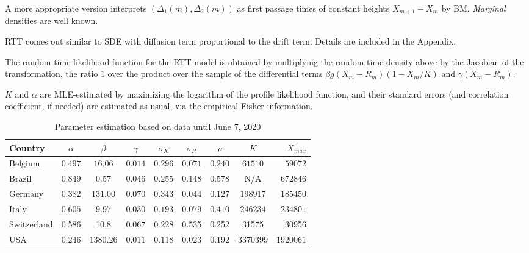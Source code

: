 \documentclass{article}
\begin{document}
\bigskip

\noindent A more appropriate version interprets $(\Delta_1(m),\Delta_2(m))$ as first passage times of constant heights $X_{m+1}-X_m$ by BM. {\em Marginal} densities are well known. 

\bigskip

\noindent RTT comes out similar to SDE with diffusion term proportional to the drift term. Details are included in the Appendix.

\bigskip

\noindent The random time likelihood function for the RTT model is obtained by multiplying the random time density above by the Jacobian of the transformation, the ratio $1$ over the product over the sample of the differential terms $\beta g(X_m-R_m)(1-X_m/K)$ and $\gamma (X_m-R_m)$.

\bigskip

\noindent $K$ and $\alpha$ are MLE-estimated by maximizing the logarithm of the profile likelihood function, and their standard errors (and correlation coefficient, if needed) are estimated as usual, via the empirical Fisher information.

\newpage

\begin{table}
\begin{center}
\begin{tabular}{l|ccccccc|r}
Country & $\alpha$ & $\beta$ & $\gamma$ & $\sigma_X $ & $ \sigma_R$ & $\rho$ & $K$ & $X_{max}$ \\ \hline
Belgium & $0.497$ & $16.06$ & $0.014$ & $0.296$ & $0.071$ & $0.240$ & $61510$ & $59072$ \\
Brazil  & $0.849$ & $0.57$ & $0.046$ & $0.255$ & $0.148$ & $0.578$ & N/A & $672846$ \\
Germany & $0.382$ & $131.00$ & $0.070$ & $0.343$ & $0.044$ & $0.127$ & $198917$ & $185450$ \\
Italy  & $0.605$ & $9.97$ & $0.030$ & $0.193$ & $0.079$ & $0.410$ & $246234$ & $234801$ \\
Switzerland & 0.586	 &	10.8 & 0.067 & 0.228  & 0.535 & 0.252 & 31575&      30956	    \\
USA    & $0.246$  & $1380.26$ & $0.011$ & $0.118$ & $0.023$ & $0.192$ & $3370399$ & $1920061$ \\ \hline
\end{tabular}
\caption{
Parameter estimation based on data until June 7, 2020
\label{tablejune7}
}
\end{center}
\end{table}
\end{document}

